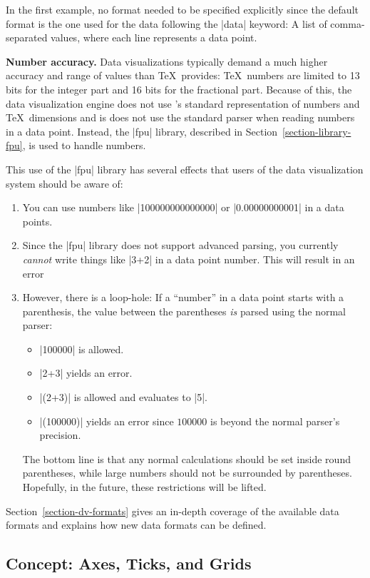 In the first example, no format needed to be specified explicitly
since the default format is the one used for the data following the
|data| keyword: A list of comma-separated values, where each line
represents a data point. 

\medskip
\textbf{Number accuracy.}
Data visualizations typically demand a much higher accuracy and range
of values than \TeX\ provides: \TeX\ numbers are limited to 13 bits
for the integer part and 16 bits for the fractional part. Because of
this, the data visualization engine does not use \pgfname's standard
representation of numbers and \TeX\ dimensions and is does not use the
standard parser when reading numbers in a data point. Instead, the
|fpu| library, described in Section~\ref{section-library-fpu}, is used
to handle numbers.

This use of the |fpu| library has several effects that users of the data
visualization system should be aware of:
\begin{enumerate}
\item You can use numbers like |100000000000000| or |0.00000000001| in
  a data points.
\item Since the |fpu| library does not support advanced parsing, you
  currently \emph{cannot} write things like |3+2| in a data point
  number. This will result in an error
\item However, there is a loop-hole: If a ``number'' in a data point
  starts with a parenthesis, the value between the parentheses
  \emph{is} parsed using the normal parser:
  \begin{itemize}
  \item |100000| is allowed.
  \item |2+3| yields an error.
  \item |(2+3)| is allowed and evaluates to |5|.
  \item |(100000)| yields an error since $100000$ is beyond the normal
    parser's precision.
  \end{itemize}
  The bottom line is that any normal calculations should be set inside
  round parentheses, while large numbers should not be surrounded by
  parentheses. Hopefully, in the future, these restrictions will be
  lifted. 
\end{enumerate}


Section~\ref{section-dv-formats} gives an
in-depth coverage of the available data formats and explains how new
data formats can be defined.




\subsection{Concept: Axes, Ticks, and Grids}

